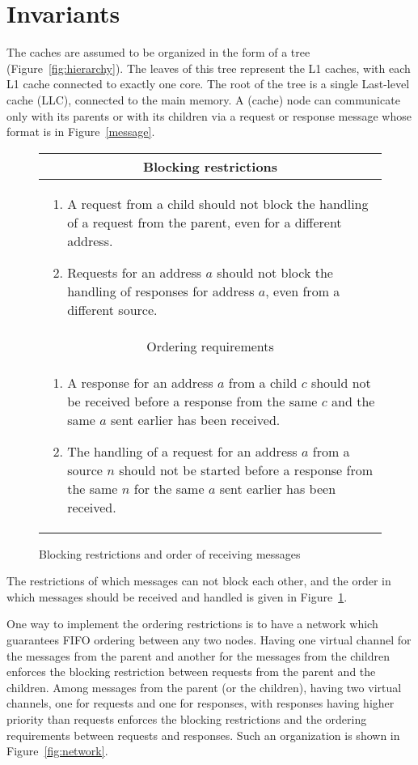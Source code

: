 \section{Invariants}
\label{sec:invariants}

The caches are assumed to be organized in the form of a tree
(Figure~\ref{fig:hierarchy}). The leaves of this tree represent the L1 caches,
with each L1 cache connected to exactly one core. The root of the tree is a
single Last-level cache (LLC), connected to the main memory. A (cache) node can
communicate only with its parents or with its children via a request or
response message whose format is in Figure~\ref{message}.

\begin{figure}
\begin{tabularx}{\linewidth}{|X|}
\hline
\multicolumn{1}{|c|}{Blocking restrictions}\\
\hline
\begin{enumerate}
\item A request from a child should not block the handling of a request from
the parent, even for a different address.
\item Requests for an address $a$ should not block the handling of responses
for address $a$, even from a different source.
\end{enumerate}\\
\hline
\multicolumn{1}{|c|}{Ordering requirements}\\
\hline
\begin{enumerate}
\item A response for an address $a$ from a child $c$ should not be received
before a response from the same $c$ and the same $a$ sent earlier has been
received.
\item The handling of a request for an address $a$ from a source $n$ should not
be started before a response from the same $n$ for the same $a$ sent earlier
has been received.
\end{enumerate}\\
\hline
\end{tabularx}
\caption{Blocking restrictions and order of receiving messages}
\label{receiveOrder}
\end{figure}

The restrictions of which messages can not block each other, and the order in
which messages should be received and handled is given in
Figure~\ref{receiveOrder}.

One way to implement the ordering restrictions is to have a network which
guarantees FIFO ordering between any two nodes. Having one virtual channel for
the messages from the parent and another for the messages from the children
enforces the blocking restriction between requests from the parent and the
children. Among messages from the parent (or the children), having two virtual
channels, one for requests and one for responses, with responses having higher
priority than requests enforces the blocking restrictions and the ordering
requirements between requests and responses. Such an organization is shown in
Figure~\ref{fig:network}.

